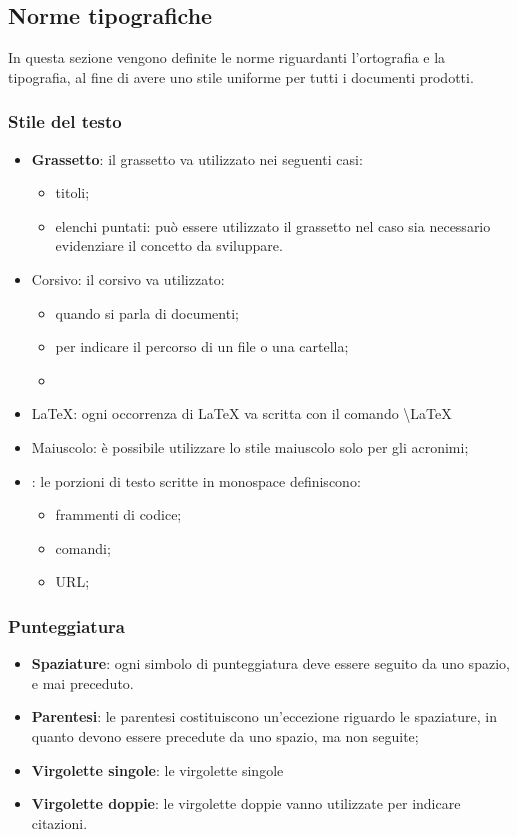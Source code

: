 	
	\subsection{Norme tipografiche}
	In questa sezione vengono definite le norme riguardanti l'ortografia e la tipografia, al fine di avere uno stile uniforme per tutti i documenti prodotti.
		\subsubsection{Stile del testo}
		\begin{itemize}
			\item \textbf{Grassetto}: il grassetto va utilizzato nei seguenti casi:
			\begin{itemize}
				\item titoli;
				\item elenchi puntati: può essere utilizzato il grassetto nel caso sia necessario evidenziare il concetto da sviluppare.
			\end{itemize}
			\item Corsivo: il corsivo va utilizzato:
			\begin{itemize}
				\item quando si parla di documenti;
				\item per indicare il percorso di un file o una cartella;
				\item 
			\end{itemize}
			\item \LaTeX: ogni occorrenza di \LaTeX{} va scritta con il comando \textbackslash LaTeX
			\item Maiuscolo: è possibile utilizzare lo stile maiuscolo solo per gli acronimi;
			\item {}: le porzioni di testo scritte in monospace definiscono:
			\begin{itemize}
				\item frammenti di codice;
				\item comandi;
				\item URL;
			\end{itemize} 
		\end{itemize}
		\subsubsection{Punteggiatura}
		\begin{itemize}
			\item \textbf{Spaziature}: ogni simbolo di punteggiatura deve essere seguito da uno spazio, e mai preceduto. 
			\item \textbf{Parentesi}: le parentesi costituiscono un'eccezione riguardo le spaziature, in quanto devono essere precedute da uno spazio, ma non seguite;
			\item \textbf{Virgolette singole}: le virgolette singole
			\item \textbf{Virgolette doppie}: le virgolette doppie vanno utilizzate per indicare citazioni.
		\end{itemize}
